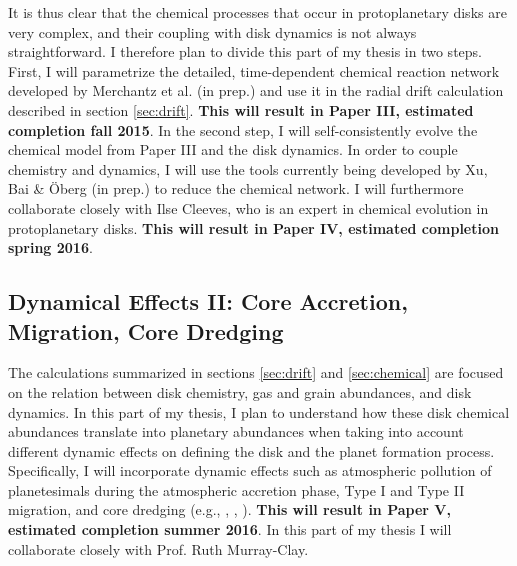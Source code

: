 \documentclass[manuscript]{aastex}
\begin{document}
It is thus clear that the chemical processes that occur in protoplanetary disks are very complex, and their coupling with disk dynamics is not always straightforward. I therefore plan to divide this part of my thesis in two steps. First, I will parametrize the detailed, time-dependent chemical reaction network developed by Merchantz et al. (in prep.) and use it in the radial drift calculation described in section \ref{sec:drift}. \textbf{This will result in Paper III, estimated completion fall 2015}. In the second step, I will self-consistently evolve the chemical model from Paper III and the disk dynamics. In order to couple chemistry and dynamics, I will use the tools currently being developed by Xu, Bai \& \"Oberg (in prep.) to reduce the chemical network. I will furthermore  collaborate closely with Ilse Cleeves, who is an expert in chemical evolution in protoplanetary disks. \textbf{This will result in Paper IV, estimated completion spring 2016}. %



\subsection{Dynamical Effects II: Core Accretion, Migration, Core Dredging}

The calculations summarized in sections \ref{sec:drift} and \ref{sec:chemical} are focused on the relation between disk chemistry, gas and grain abundances, and disk dynamics. In this part of my thesis, I plan to understand how these disk chemical abundances translate into planetary abundances when taking into account different dynamic effects on defining the disk and the planet formation process. Specifically, I will incorporate dynamic effects such as atmospheric pollution of planetesimals during the atmospheric accretion phase, Type I and Type II migration, and core dredging (e.g., \citealt{lodders09}, \citealt{stevenson85}, \citealt{guillot04}). \textbf{This will result in Paper V, estimated completion summer 2016}. In this part of my thesis I will collaborate closely with Prof. Ruth Murray-Clay.
\end{document}
